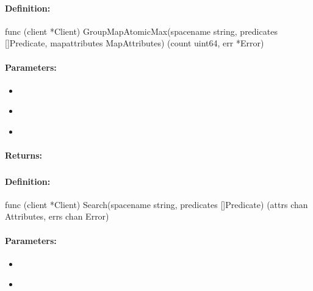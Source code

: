 \paragraph{Definition:}
\begin{gocode}
func (client *Client) GroupMapAtomicMax(spacename string, predicates []Predicate, mapattributes MapAttributes) (count uint64, err *Error)
\end{gocode}

\paragraph{Parameters:}
\begin{itemize}[noitemsep]
\item {}\\

\item {}\\

\item {}\\

\end{itemize}

\paragraph{Returns:}


\pagebreak
\subsubsection{}
\label{api:Go:Search}


\paragraph{Definition:}
\begin{gocode}
func (client *Client) Search(spacename string, predicates []Predicate) (attrs chan Attributes, errs chan Error)
\end{gocode}

\paragraph{Parameters:}
\begin{itemize}[noitemsep]
\item {}\\

\item {}\\

\end{itemize}

